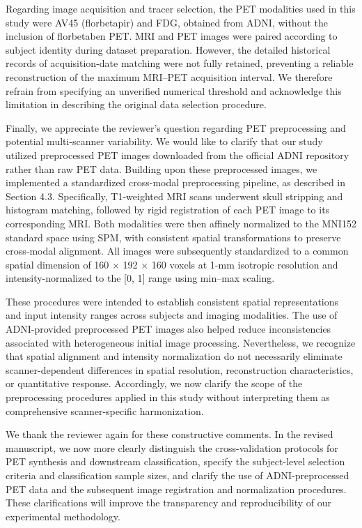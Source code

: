 {Regarding image acquisition and tracer selection, the PET modalities used in this study were AV45 (florbetapir) and FDG, obtained from ADNI, without the inclusion of florbetaben PET. MRI and PET images were paired according to subject identity during dataset preparation. However, the detailed historical records of acquisition-date matching were not fully retained, preventing a reliable reconstruction of the maximum MRI–PET acquisition interval. We therefore refrain from specifying an unverified numerical threshold and acknowledge this limitation in describing the original data selection procedure.

Finally, we appreciate the reviewer’s question regarding PET preprocessing and potential multi-scanner variability. We would like to clarify that our study utilized preprocessed PET images downloaded from the official ADNI repository rather than raw PET data. Building upon these preprocessed images, we implemented a standardized cross-modal preprocessing pipeline, as described in Section 4.3. Specifically, T1-weighted MRI scans underwent skull stripping and histogram matching, followed by rigid registration of each PET image to its corresponding MRI. Both modalities were then affinely normalized to the MNI152 standard space using SPM, with consistent spatial transformations to preserve cross-modal alignment. All images were subsequently standardized to a common spatial dimension of 160 \ensuremath{\times} 192 \ensuremath{\times} 160 voxels at 1-mm isotropic resolution and intensity-normalized to the [0, 1] range using min–max scaling.

These procedures were intended to establish consistent spatial representations and input intensity ranges across subjects and imaging modalities. The use of ADNI-provided preprocessed PET images also helped reduce inconsistencies associated with heterogeneous initial image processing. Nevertheless, we recognize that spatial alignment and intensity normalization do not necessarily eliminate scanner-dependent differences in spatial resolution, reconstruction characteristics, or quantitative response. Accordingly, we now clarify the scope of the preprocessing procedures applied in this study without interpreting them as comprehensive scanner-specific harmonization.

We thank the reviewer again for these constructive comments. In the revised manuscript, we now more clearly distinguish the cross-validation protocols for PET synthesis and downstream classification, specify the subject-level selection criteria and classification sample sizes, and clarify the use of ADNI-preprocessed PET data and the subsequent image registration and normalization procedures. These clarifications will improve the transparency and reproducibility of our experimental methodology.}

